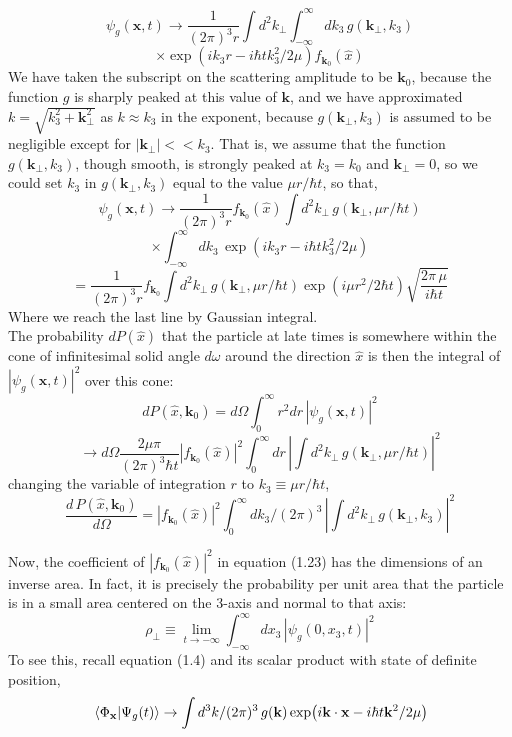 \documentclass[12pt]{article}
\numberwithin{equation}{section}
\begin{document}
\[\psi_{g}(\mathbf{x}, t)\rightarrow\frac{1}{(2\pi)^3r}\int{d^2k_{\perp}}\int_{-\infty}^{\infty}{dk_3\,g(\mathbf{k}_{\perp}, k_3)}\]
\begin{equation}
    \times\exp(ik_3r-i\hbar tk_3^2/2\mu)f_{\mathbf{k}_0}(\hat{x})
\end{equation}
We have taken the subscript on the scattering amplitude to be $\mathbf{k}_{0}$, because the function $g$ is sharply peaked at this value of $\mathbf{k}$, and we have approximated $k = \sqrt{k_3^2+\mathbf{k}_{\perp}^2}$ as $k\approx k_3$ in the exponent, because $g(\mathbf{k}_{\perp}, k_3)$ is assumed to be negligible except for $|\mathbf{k}_{\perp}|<<k_3$.
That is, we assume that the function $g(\mathbf{k}_{\perp}, k_3)$, though smooth, is strongly peaked at $k_3=k_0$ and $\mathbf{k}_{\perp} = 0$, so we could set $k_3$ in $g(\mathbf{k}_{\perp}, k_3)$ equal to the value $\mu r/\hbar t$, so that,
\[
    \psi_{g}(\mathbf{x}, t)\rightarrow\frac{1}{(2\pi)^3r}f_{\mathbf{k}_0}(\hat{x})\int{d^2k_{\perp}\,g(\mathbf{k}_{\perp}, \mu r/\hbar t)}
\]
\[\times\int_{-\infty}^{\infty}{dk_3\,\exp(ik_3r-i\hbar tk_3^2/2\mu)}\]
\begin{equation}
    =\frac{1}{(2\pi)^3r}f_{\mathbf{k}_0}\int{d^2k_{\perp}\,g(\mathbf{k}_{\perp}, \mu r/\hbar t)\exp(i\mu r^2/2\hbar t)\sqrt{\frac{2\pi\,\mu}{i\hbar t}}}
\end{equation}
Where we reach the last line by Gaussian integral.
\\\indent The probability $dP(\hat{x})$ that the particle at late times is somewhere within the cone of infinitesimal solid angle $d\omega$ around the direction $\hat{x}$ is then the integral of $|\psi_{g}(\mathbf{x}, t)|^2$ over this cone:
\begin{equation}
    dP(\hat{x}, \mathbf{k}_0) = d\Omega\int_{0}^{\infty}{r^2dr\,|\psi_{g}(\mathbf{x}, t)|^2}
\end{equation}
\[\rightarrow d\Omega\frac{2\mu\pi}{(2\pi)^3\hbar t}|f_{\mathbf{k}_0}(\hat{x})|^2\int_{0}^{\infty}{dr\,\left|\int{d^2k_{\perp}\,g(\mathbf{k}_{\perp}, \mu r/\hbar t)}\right|^2}\]
changing the variable of integration $r$ to $k_3\equiv\mu r/\hbar t$,
\begin{equation}
    \frac{d\,P(\hat{x}, \mathbf{k}_0)}{d\Omega} = |f_{\mathbf{k}_0}(\hat{x})|^2\int_{0}^{\infty}{dk_3/(2\pi)^3\,\left|\int{d^2k_{\perp}\,g(\mathbf{k}_{\perp}, k_3)}\right|^2}
\end{equation}

Now, the coefficient of $|f_{\mathbf{k}_0}(\hat{x})|^2$ in equation (1.23) has the dimensions of an inverse area. In fact, it is precisely the probability per unit area that the particle is in a small area centered on the 3-axis and normal to that axis:
\begin{equation}
    \rho_{\perp}\equiv\lim_{t\rightarrow-\infty}\int_{-\infty}^{\infty}{dx_{3}\,\left|\psi_{g}(0, x_3, t)\right|^2}
\end{equation}
To see this, recall equation (1.4) and its scalar product with state of definite position,
\[\braket*{\Phi_{\mathbf{x}}}{\Psi_{g}(t)}\rightarrow\int{d^3k/(2\pi)^3\,g(\mathbf{k})\exp(i\mathbf{k}\cdot\mathbf{x}-i\hbar t\mathbf{k}^2/2\mu)}\]
\end{document}
